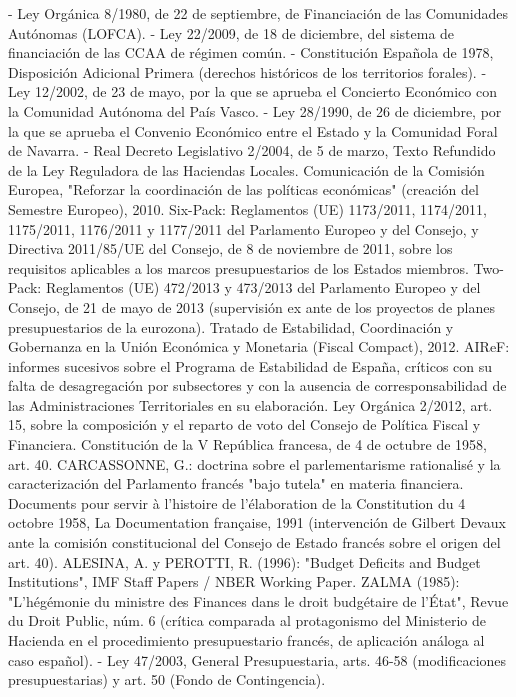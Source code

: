 \documentclass[10pt,a4paper]{article}
\begin{document}
- Ley Orgánica 8/1980, de 22 de septiembre, de Financiación de las Comunidades Autónomas (LOFCA).
- Ley 22/2009, de 18 de diciembre, del sistema de financiación de las CCAA de régimen común.
- Constitución Española de 1978, Disposición Adicional Primera (derechos históricos de los territorios forales).
- Ley 12/2002, de 23 de mayo, por la que se aprueba el Concierto Económico con la Comunidad Autónoma del País Vasco.
- Ley 28/1990, de 26 de diciembre, por la que se aprueba el Convenio Económico entre el Estado y la Comunidad Foral de Navarra.
- Real Decreto Legislativo 2/2004, de 5 de marzo, Texto Refundido de la Ley Reguladora de las Haciendas Locales.
Comunicación de la Comisión Europea, "Reforzar la coordinación de las políticas económicas" (creación del Semestre Europeo), 2010.
Six-Pack: Reglamentos (UE) 1173/2011, 1174/2011, 1175/2011, 1176/2011 y 1177/2011 del Parlamento Europeo y del Consejo, y Directiva 2011/85/UE del Consejo, de 8 de noviembre de 2011, sobre los requisitos aplicables a los marcos presupuestarios de los Estados miembros.
Two-Pack: Reglamentos (UE) 472/2013 y 473/2013 del Parlamento Europeo y del Consejo, de 21 de mayo de 2013 (supervisión ex ante de los proyectos de planes presupuestarios de la eurozona).
Tratado de Estabilidad, Coordinación y Gobernanza en la Unión Económica y Monetaria (Fiscal Compact), 2012.
AIReF: informes sucesivos sobre el Programa de Estabilidad de España, críticos con su falta de desagregación por subsectores y con la ausencia de corresponsabilidad de las Administraciones Territoriales en su elaboración.
Ley Orgánica 2/2012, art. 15, sobre la composición y el reparto de voto del Consejo de Política Fiscal y Financiera.
Constitución de la V República francesa, de 4 de octubre de 1958, art. 40.
CARCASSONNE, G.: doctrina sobre el parlementarisme rationalisé y la caracterización del Parlamento francés "bajo tutela" en materia financiera.
Documents pour servir à l'histoire de l'élaboration de la Constitution du 4 octobre 1958, La Documentation française, 1991 (intervención de Gilbert Devaux ante la comisión constitucional del Consejo de Estado francés sobre el origen del art. 40).
ALESINA, A. y PEROTTI, R. (1996): "Budget Deficits and Budget Institutions", IMF Staff Papers / NBER Working Paper.
ZALMA (1985): "L'hégémonie du ministre des Finances dans le droit budgétaire de l'État", Revue du Droit Public, núm. 6 (crítica comparada al protagonismo del Ministerio de Hacienda en el procedimiento presupuestario francés, de aplicación análoga al caso español).
- Ley 47/2003, General Presupuestaria, arts. 46-58 (modificaciones presupuestarias) y art. 50 (Fondo de Contingencia).
\end{document}

